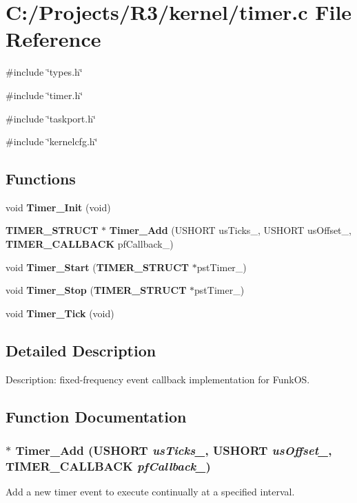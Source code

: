 \section{C:/Projects/R3/kernel/timer.c File Reference}
\label{timer_8c}
{\ttfamily \#include \char`\"{}types.h\char`\"{}}\par
{\ttfamily \#include \char`\"{}timer.h\char`\"{}}\par
{\ttfamily \#include \char`\"{}taskport.h\char`\"{}}\par
{\ttfamily \#include \char`\"{}kernelcfg.h\char`\"{}}\par
\subsection*{Functions}
\begin{DoxyCompactItemize}
\item 
void {\bf Timer\_\-Init} (void)
\item 
{\bf TIMER\_\-STRUCT} $\ast$ {\bf Timer\_\-Add} (USHORT usTicks\_\-, USHORT usOffset\_\-, {\bf TIMER\_\-CALLBACK} pfCallback\_\-)
\item 
void {\bf Timer\_\-Start} ({\bf TIMER\_\-STRUCT} $\ast$pstTimer\_\-)
\item 
void {\bf Timer\_\-Stop} ({\bf TIMER\_\-STRUCT} $\ast$pstTimer\_\-)
\item 
void {\bf Timer\_\-Tick} (void)
\end{DoxyCompactItemize}


\subsection{Detailed Description}
Description: fixed-\/frequency event callback implementation for FunkOS. 

\subsection{Function Documentation}
\subsubsection[{Timer\_\-Add}]{ $\ast$ Timer\_\-Add (USHORT {\em usTicks\_\-}, \/  USHORT {\em usOffset\_\-}, \/  {\bf TIMER\_\-CALLBACK} {\em pfCallback\_\-})}\label{timer_8c_a5af440bb193659f34944913addcbda9a}
Add a new timer event to execute continually at a specified interval.


